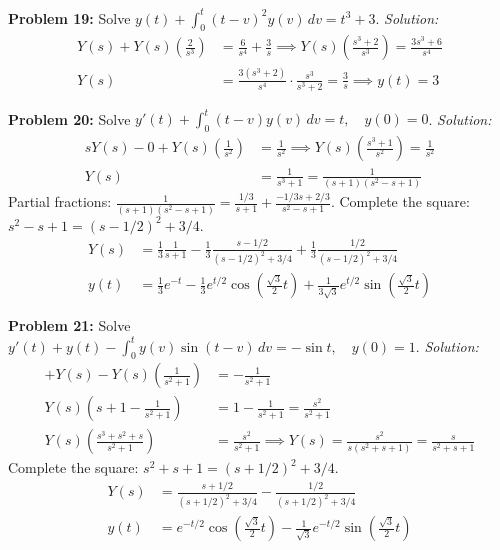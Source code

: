 \documentclass[11pt, letterpaper]{article}
\theoremstyle{definition}
\theoremstyle{remark}
\begin{document}
\textbf{Problem 19:} Solve $y(t) + \int_0^t (t-v)^2 y(v) \, dv = t^3 + 3$.
\textit{Solution:}
\begin{align*}
Y(s) + Y(s)\left(\frac{2}{s^3}\right) &= \frac{6}{s^4} + \frac{3}{s} \implies Y(s)\left(\frac{s^3+2}{s^3}\right) = \frac{3s^3+6}{s^4} \\[4pt]
Y(s) &= \frac{3(s^3+2)}{s^4} \cdot \frac{s^3}{s^3+2} = \frac{3}{s} \implies y(t) = 3
\end{align*}

\textbf{Problem 20:} Solve $y'(t) + \int_0^t (t-v)y(v) \, dv = t, \quad y(0)=0$.
\textit{Solution:}
\begin{align*}
sY(s) - 0 + Y(s)\left(\frac{1}{s^2}\right) &= \frac{1}{s^2} \implies Y(s)\left(\frac{s^3+1}{s^2}\right) = \frac{1}{s^2} \\[4pt]
Y(s) &= \frac{1}{s^3+1} = \frac{1}{(s+1)(s^2-s+1)}
\end{align*}
Partial fractions: $\frac{1}{(s+1)(s^2-s+1)} = \frac{1/3}{s+1} + \frac{-1/3 s + 2/3}{s^2-s+1}$.
Complete the square: $s^2-s+1 = (s-1/2)^2 + 3/4$.
\begin{align*}
Y(s) &= \frac{1}{3}\frac{1}{s+1} - \frac{1}{3}\frac{s-1/2}{(s-1/2)^2+3/4} + \frac{1}{3}\frac{1/2}{(s-1/2)^2+3/4} \\[4pt]
y(t) &= \frac{1}{3}e^{-t} - \frac{1}{3}e^{t/2}\cos\left(\frac{\sqrt{3}}{2}t\right) + \frac{1}{3\sqrt{3}}e^{t/2}\sin\left(\frac{\sqrt{3}}{2}t\right)
\end{align*}

\textbf{Problem 21:} Solve $y'(t) + y(t) - \int_0^t y(v)\sin(t-v) \, dv = -\sin t, \quad y(0)=1$.
\textit{Solution:}
\begin{align*}
[sY(s) - 1] + Y(s) - Y(s)\left(\frac{1}{s^2+1}\right) &= -\frac{1}{s^2+1} \\[4pt]
Y(s)\left(s + 1 - \frac{1}{s^2+1}\right) &= 1 - \frac{1}{s^2+1} = \frac{s^2}{s^2+1} \\[4pt]
Y(s)\left(\frac{s^3+s^2+s}{s^2+1}\right) &= \frac{s^2}{s^2+1} \implies Y(s) = \frac{s^2}{s(s^2+s+1)} = \frac{s}{s^2+s+1}
\end{align*}
Complete the square: $s^2+s+1 = (s+1/2)^2 + 3/4$.
\begin{align*}
Y(s) &= \frac{s+1/2}{(s+1/2)^2+3/4} - \frac{1/2}{(s+1/2)^2+3/4} \\[4pt]
y(t) &= e^{-t/2}\cos\left(\frac{\sqrt{3}}{2}t\right) - \frac{1}{\sqrt{3}}e^{-t/2}\sin\left(\frac{\sqrt{3}}{2}t\right)
\end{align*}
\end{document}
